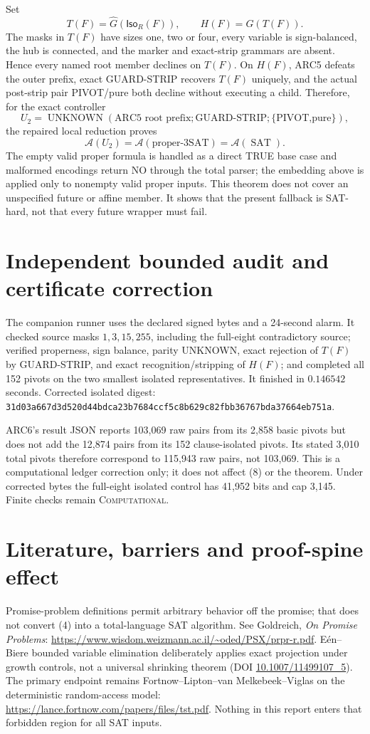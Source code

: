 \documentclass[11pt]{article}
\newcommand{\SAT}{\operatorname{SAT}}
\newcommand{\A}{\mathcal A}
\begin{document}
Set
\[
 T(F)=\widehat G(\mathsf{Iso}_R(F)),\qquad H(F)=G(T(F)).  \tag{10}
\]
The masks in $T(F)$ have sizes one, two or four, every variable is
sign-balanced, the hub is connected, and the marker and exact-strip grammars
are absent.  Hence every named root member declines on $T(F)$.  On $H(F)$,
ARC5 defeats the outer prefix, exact GUARD-STRIP recovers $T(F)$ uniquely,
and the actual post-strip pair PIVOT/pure both decline without executing a
child.  Therefore, for the exact controller
\[
U_2=\operatorname{UNKNOWN}(\text{ARC5 root prefix};
 \text{GUARD-STRIP};\{\text{PIVOT,pure}\}),
\]
the repaired local reduction proves
\[
 \boxed{\A(U_2)=\A(\text{proper-3SAT})=\A(\SAT).}        \tag{11}
\]
The empty valid proper formula is handled as a direct TRUE base case and
malformed encodings return NO through the total parser; the embedding above
is applied only to nonempty valid proper inputs.
This theorem does not cover an unspecified future or affine member.  It
shows that the present fallback is SAT-hard, not that every future wrapper
must fail.

\section{Independent bounded audit and certificate correction}
The companion runner uses the declared signed bytes and a 24-second alarm.
It checked source masks $1,3,15,255$, including the full-eight contradictory
source; verified properness, sign balance, parity UNKNOWN, exact rejection of
$T(F)$ by GUARD-STRIP, and exact recognition/stripping of $H(F)$; and completed
all 152 pivots on the two smallest isolated representatives.  It finished in
$0.146542$ seconds.  Corrected isolated digest:
\texttt{31d03a667d3d520d44bdca23b7684ccf5c8b629c82fbb36767bda37664eb751a}.

ARC6's result JSON reports 103,069 raw pairs from its 2,858 basic pivots but
does not add the 12,874 pairs from its 152 clause-isolated pivots.  Its stated
3,010 total pivots therefore correspond to 115,943 raw pairs, not 103,069.
This is a computational ledger correction only; it does not affect (8) or
the theorem.  Under corrected bytes the full-eight isolated control has
41,952 bits and cap 3,145.  Finite checks remain \textsc{Computational}.

\section{Literature, barriers and proof-spine effect}
Promise-problem definitions permit arbitrary behavior off the promise; that
does not convert (4) into a total-language SAT algorithm.  See Goldreich,
\emph{On Promise Problems}:
\url{https://www.wisdom.weizmann.ac.il/~oded/PSX/prpr-r.pdf}.
E\'en--Biere bounded variable elimination deliberately applies exact
projection under growth controls, not a universal shrinking theorem
(DOI \href{https://doi.org/10.1007/11499107_5}{10.1007/11499107\_5}).
The primary endpoint remains Fortnow--Lipton--van Melkebeek--Viglas on the
deterministic random-access model:
\url{https://lance.fortnow.com/papers/files/tst.pdf}.  Nothing in this report
enters that forbidden region for all SAT inputs.
\end{document}

